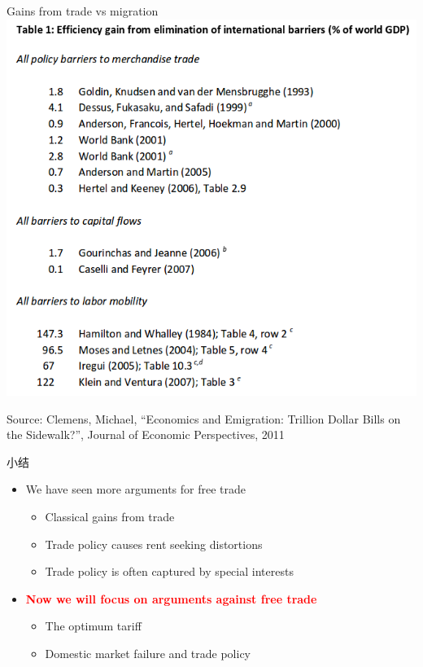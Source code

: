 \documentclass[10pt,hyperref={CJKbookmarks=true},xcolor=dvipsnames,aspectratio=169]{beamer}
\begin{document}
\begin{frame}{Gains from trade vs migration}
\centering \includegraphics[scale=0.25]{fig/politic/gains_to_migration.png}

{\tiny Source: Clemens, Michael, ``Economics and Emigration: Trillion Dollar Bills on the Sidewalk?'', Journal of Economic Perspectives, 2011}
\end{frame}

\begin{frame}{小结}
\begin{itemize}
\item We have seen more arguments for free trade
\begin{itemize}
\item Classical gains from trade
\item Trade policy causes rent seeking distortions
\item Trade policy is often captured by special interests
\end{itemize}
\item \textbf{\textcolor{red}{Now we will focus on arguments against free trade}}
\begin{itemize}
\item The optimum tariff
\item Domestic market failure and trade policy
\end{itemize}
\end{itemize}
\end{frame}
\end{document}
